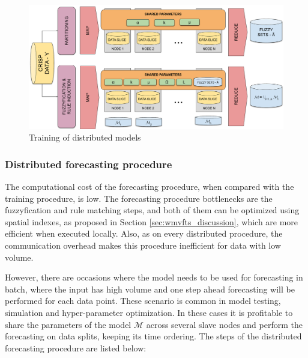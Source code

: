 \begin{figure}[htb]
    \centering
    \includegraphics[width=\textwidth]{figures/distributed_models_training.pdf}
    \caption{Training of distributed models}
    \label{fig:distributed_models_training}
\end{figure}

\subsubsection{Distributed forecasting procedure}
\label{sec:distributed_forecasting}

The computational cost of the forecasting procedure, when compared with the training procedure, is low. The forecasting procedure bottlenecks are the fuzzyfication and rule matching steps, and both of them can be optimized using spatial indexes, as proposed in Section \ref{sec:wmvfts_discussion}, which are more efficient when executed locally. Also, as on every distributed procedure, the communication overhead makes this procedure inefficient for data with low volume.

However, there are occasions where the model needs to be used for forecasting in batch, where the input has high volume and one step ahead forecasting will be performed for each data point. These scenario is common in model testing, simulation and hyper-parameter optimization. In these cases it is profitable to share the parameters of the model $\mathcal{M}$ across several slave nodes and perform the forecasting on data splits, keeping its time ordering. The steps of the distributed forecasting procedure are listed below:

